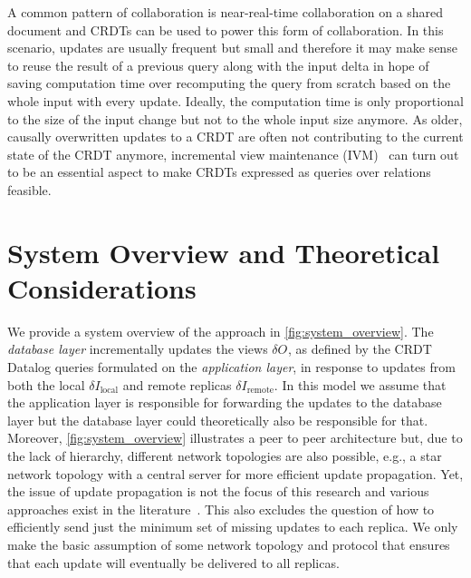 \documentclass{article}
\newcommand{\deltaI}[1]{\(\delta I_{\text{#1}}\)}
\newcommand{\deltaO}[1][]{\(\delta O_{\text{#1}}\)}
\begin{document}
A common pattern of collaboration is near-real-time collaboration on a shared
document and CRDTs can be used to power this form of collaboration.
In this scenario, updates are usually frequent but small and therefore it
may make sense to reuse the result of a previous query along with the input
delta in hope of saving computation time over recomputing the query from scratch
based on the whole input with every update.
Ideally, the computation time is only proportional to the size of the input
change but not to the whole input size anymore.
As older, causally overwritten updates to a CRDT are often not contributing
to the current state of the CRDT anymore, incremental view
maintenance (IVM)~\cite{mcsherry2013differential, budiu2022dbsp, budiu2024dbsp}
can turn out to be an essential aspect to make CRDTs expressed as
queries over relations feasible.

\section{System Overview and Theoretical Considerations}
\label{sec:system_overview}

We provide a system overview of the approach in \autoref{fig:system_overview}.
The \emph{database layer} incrementally updates the views \deltaO{},
as defined by the CRDT Datalog queries formulated on the \emph{application layer},
in response to updates from both the local \deltaI{local} and remote replicas
\deltaI{remote}.
In this model we assume that the application layer is responsible for forwarding
the updates to the database layer but the database layer could theoretically
also be responsible for that.
Moreover, \autoref{fig:system_overview} illustrates a peer to peer architecture
but, due to the lack of hierarchy, different network topologies are also possible,
e.g., a star network topology with a central server for more efficient update
propagation.
Yet, the issue of update propagation is not the focus of this research and
various approaches exist in the literature~\cite{auvolat2019merkle, sanjuan2020merkle}.
This also excludes the question of how to efficiently send just the minimum
set of missing updates to each replica.
We only make the basic assumption of some network topology and protocol
that ensures that each update will eventually be delivered to all replicas.
\end{document}
